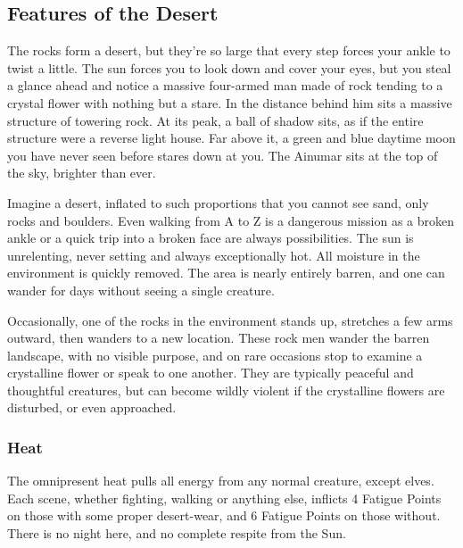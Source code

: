 \begin{multicols}{2}

\subsection{Features of the Desert}

\encDesert


\begin{boxtext}

  The rocks form a desert, but they're so large that every step forces your ankle to twist a little.
  The sun forces you to look down and cover your eyes, but you steal a glance ahead and notice a massive four-armed man made of rock tending to a crystal flower with nothing but a stare.
  In the distance behind him sits a massive structure of towering rock.
  At its peak, a ball of shadow sits, as if the entire structure were a reverse light house.
  Far above it, a green and blue daytime moon you have never seen before stares down at you.
  The Ainumar sits at the top of the sky, brighter than ever.

\end{boxtext}

\noindent
Imagine a desert, inflated to such proportions that you cannot see sand, only rocks and boulders.
Even walking from A to Z is a dangerous mission as a broken ankle or a quick trip into a broken face are always possibilities.  The sun is unrelenting, never setting and always exceptionally hot.  All moisture in the environment is quickly removed.  The area is nearly entirely barren, and one can wander for days without seeing a single creature.

Occasionally, one of the rocks in the environment stands up, stretches a few arms outward, then wanders to a new location.
These rock men wander the barren landscape, with no visible purpose, and on rare occasions stop to examine a crystalline flower or speak to one another.
They are typically peaceful and thoughtful creatures, but can become wildly violent if the crystalline flowers are disturbed, or even approached.

\subsubsection{Heat}

The omnipresent heat pulls all energy from any normal creature, except elves.
Each scene, whether fighting, walking or anything else, inflicts 4 Fatigue Points on those with some proper desert-wear, and 6 Fatigue Points on those without.
There is no night here, and no complete respite from the Sun.


\end{multicols}

